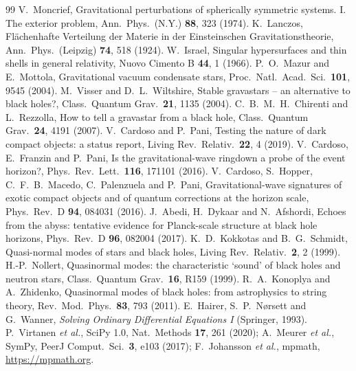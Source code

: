 \documentclass[11pt,a4paper]{article}
\numberwithin{equation}{section}
\begin{document}
\begin{thebibliography}{99}
 V.~Moncrief, Gravitational perturbations of spherically symmetric systems. I. The exterior problem, Ann.\ Phys.\ (N.Y.) \textbf{88}, 323 (1974).
 K.~Lanczos, Fl\"achenhafte Verteilung der Materie in der Einsteinschen Gravitationstheorie, Ann.\ Phys.\ (Leipzig) \textbf{74}, 518 (1924).
 W.~Israel, Singular hypersurfaces and thin shells in general relativity, Nuovo Cimento B \textbf{44}, 1 (1966).
 P.~O.~Mazur and E.~Mottola, Gravitational vacuum condensate stars, Proc.\ Natl.\ Acad.\ Sci.\ \textbf{101}, 9545 (2004).
 M.~Visser and D.~L.~Wiltshire, Stable gravastars -- an alternative to black holes?, Class.\ Quantum Grav.\ \textbf{21}, 1135 (2004).
 C.~B.~M.~H.~Chirenti and L.~Rezzolla, How to tell a gravastar from a black hole, Class.\ Quantum Grav.\ \textbf{24}, 4191 (2007).
 V.~Cardoso and P.~Pani, Testing the nature of dark compact objects: a status report, Living Rev.\ Relativ.\ \textbf{22}, 4 (2019).
 V.~Cardoso, E.~Franzin and P.~Pani, Is the gravitational-wave ringdown a probe of the event horizon?, Phys.\ Rev.\ Lett.\ \textbf{116}, 171101 (2016).
 V.~Cardoso, S.~Hopper, C.~F.~B.~Macedo, C.~Palenzuela and P.~Pani, Gravitational-wave signatures of exotic compact objects and of quantum corrections at the horizon scale, Phys.\ Rev.\ D \textbf{94}, 084031 (2016).
 J.~Abedi, H.~Dykaar and N.~Afshordi, Echoes from the abyss: tentative evidence for Planck-scale structure at black hole horizons, Phys.\ Rev.\ D \textbf{96}, 082004 (2017).
 K.~D.~Kokkotas and B.~G.~Schmidt, Quasi-normal modes of stars and black holes, Living Rev.\ Relativ.\ \textbf{2}, 2 (1999).
 H.-P.~Nollert, Quasinormal modes: the characteristic `sound' of black holes and neutron stars, Class.\ Quantum Grav.\ \textbf{16}, R159 (1999).
 R.~A.~Konoplya and A.~Zhidenko, Quasinormal modes of black holes: from astrophysics to string theory, Rev.\ Mod.\ Phys.\ \textbf{83}, 793 (2011).
 E.~Hairer, S.~P.~N{\o}rsett and G.~Wanner, \emph{Solving Ordinary Differential Equations I} (Springer, 1993).
 P.~Virtanen \emph{et al.}, SciPy 1.0, Nat.\ Methods \textbf{17}, 261 (2020); A.~Meurer \emph{et al.}, SymPy, PeerJ Comput.\ Sci.\ \textbf{3}, e103 (2017); F.~Johansson \emph{et al.}, mpmath, \url{https://mpmath.org}.
\end{thebibliography}
\end{document}
